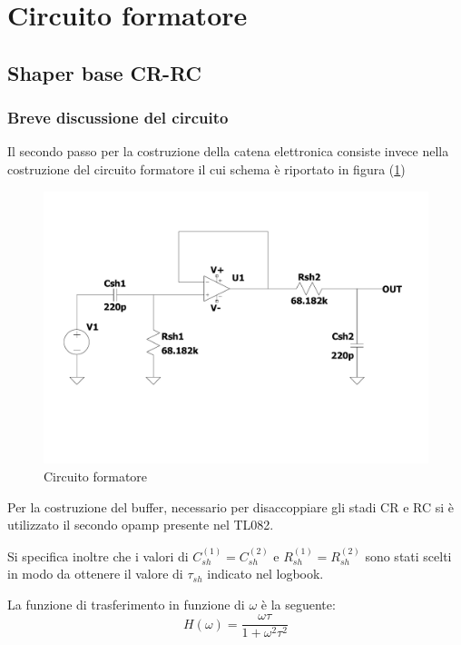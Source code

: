 \documentclass{article}
\begin{document}
\section{Circuito formatore}
\subsection{Shaper base CR-RC}
\subsubsection{Breve discussione del circuito}

Il secondo passo per la costruzione della catena elettronica consiste invece nella costruzione del circuito formatore il cui schema è riportato
in figura (\ref{fig:shaper})
\begin{center}
    \begin{figure}[H]
    \centering
    \includegraphics[scale=0.1875, angle=0]{shaper.pdf}
    \caption{Circuito formatore}
    \label{fig:shaper}
    \end{figure}
\end{center}
    

Per la costruzione del buffer, necessario per disaccoppiare gli stadi CR e RC si è utilizzato il secondo opamp presente nel TL082.

Si specifica inoltre che i valori di $C_{sh}^{(1)}=C_{sh}^{(2)}$ e $R_{sh}^{(1)}=R_{sh}^{(2)}$ sono stati scelti in modo da ottenere il valore di $\tau_{sh}$ indicato nel logbook.

La funzione di trasferimento in funzione di $\omega$ è la seguente:
\begin{equation}
H(\omega)=\frac{\omega \tau}{1+\omega^2\tau^2}
\end{equation}
\end{document}
